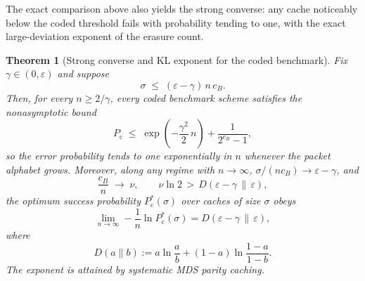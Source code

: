 \documentclass[journal]{IEEEtran}
\newtheorem{theorem}{Theorem}[section]
\numberwithin{equation}{section}
\begin{document}
The exact comparison above also yields the strong converse: any cache
noticeably below the coded threshold fails with probability tending to one,
with the exact large-deviation exponent of the erasure count.

\begin{theorem}[Strong converse and KL exponent for the coded benchmark]
\label{thm:coded-strong-converse}
Fix \(\gamma\in(0,\varepsilon)\) and suppose
\begin{equation}
  \sigma
  \;\le\;
  (\varepsilon-\gamma)\,n\,c_B.
\label{eq:below-coded-threshold}
\end{equation}
Then, for every \(n\ge 2/\gamma\), every coded benchmark scheme satisfies
the nonasymptotic bound
\begin{equation}
  P_{\mathrm c}
  \;\le\;
  \exp\!\left(-\frac{\gamma^{2}}{2}\,n\right)
  +
  \frac{1}{2^{c_B}-1},
\label{eq:strong-converse-finite}
\end{equation}
so the error probability tends to one exponentially in \(n\) whenever the
packet alphabet grows.  Moreover, along any regime with \(n\to\infty\),
\(\sigma/(nc_B)\to\varepsilon-\gamma\), and
\begin{equation}
  \frac{c_B}{n}\;\longrightarrow\;\nu,
  \qquad
  \nu\ln 2\,>\,D(\varepsilon-\gamma\,\|\,\varepsilon),
\label{eq:alphabet-growth-regime}
\end{equation}
the optimum success probability \(P_{\mathrm c}^{*}(\sigma)\) over caches of
size \(\sigma\) obeys
\begin{equation}
  \lim_{n\to\infty}
  -\frac{1}{n}\ln P_{\mathrm c}^{*}(\sigma)
  =
  D(\varepsilon-\gamma\,\|\,\varepsilon),
\label{eq:kl-exponent}
\end{equation}
where
\[
  D(a\|b)
  :=
  a\ln\frac{a}{b}
  +
  (1-a)\ln\frac{1-a}{1-b}.
\]
The exponent is attained by systematic MDS parity caching.
\end{theorem}
\end{document}
